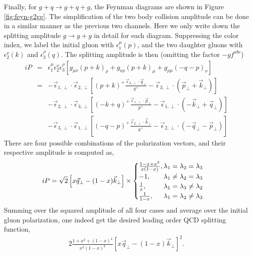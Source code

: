 Finally, for $g+q\rightarrow g+q+g$, the Feynman diagrams are shown in Figure \ref{fig:feyn-g2gg}. 
The simplification of the two body collision amplitude can be done in a similar manner as the previous two channels. 
Here we only write down the splitting amplitude $g\rightarrow g+ g$ in detail for each diagram.
Suppressing the color index, we label the initial gluon with $\epsilon_1^\mu(p)$, and the two daughter gluons with $\epsilon_2^\nu(k)$ and $\epsilon_3^\rho(q)$.
The splitting amplitude is then (omitting the factor $-gf^{abc}$)
\begin{eqnarray}
iP &=& \epsilon^\mu_1\epsilon^\nu_2\epsilon^\rho_3
\left[
g_{\mu\nu} (p+k)_{\rho} +  g_{\nu\rho} (p+k)_{\mu} + g_{\rho\mu} (-q-p)_{\nu}
\right]\\
&=& -\vec{\epsilon}_{1,\perp}\cdot \vec{\epsilon}_{2,\perp} \left[(p+k)^+\frac{\vec{\epsilon}_{3,\perp}\cdot \vec{q}_\perp}{q^+} - \vec{\epsilon}_{3,\perp}\cdot (\vec{p}_\perp+\vec{k}_\perp)\right] \\\nonumber
&&-\vec{\epsilon}_{2,\perp}\cdot \vec{\epsilon}_{3,\perp} \left[(-k+q)^+\frac{\vec{\epsilon}_{1,\perp}\cdot \vec{p}_\perp}{p^+} - \vec{\epsilon}_{1,\perp}\cdot (-\vec{k}_\perp+\vec{q}_\perp)\right]
\\\nonumber
&&-\vec{\epsilon}_{3,\perp}\cdot \vec{\epsilon}_{1,\perp} \left[(-q-p)^+\frac{\vec{\epsilon}_{2,\perp}\cdot \vec{k}_\perp}{k^+} - \vec{\epsilon}_{2,\perp}\cdot (-\vec{q}_\perp-\vec{p}_\perp)\right]
\end{eqnarray}
There are four possible combinations of the polarization vectors, and their respective amplitude is computed as,
\begin{eqnarray}
iP = \sqrt{2}\left[x\vec{q}_\perp - (1-x)\vec{k}_\perp\right]\times 
\begin{cases}
\frac{1-x+x^2}{x(1-x)}, \hfill \lambda_1=\lambda_2=\lambda_3\\
-1, \hfill \lambda_1\neq\lambda_2=\lambda_3 \\
\frac{1}{x}, \hfill \lambda_1=\lambda_3\neq\lambda_2\\
\frac{1}{1-x}, \hfill \lambda_1=\lambda_2\neq\lambda_3
\end{cases}
\end{eqnarray}
Summing over the squared amplitude of all four cases and average over the initial gluon polarization, one indeed get the desired leading order QCD splitting function,
\begin{eqnarray}
2\frac{1+x^2+(1-x)^4}{x^2(1-x)^2} \left[x\vec{q}_\perp - (1-x)\vec{k}_\perp\right]^2.
\end{eqnarray}

